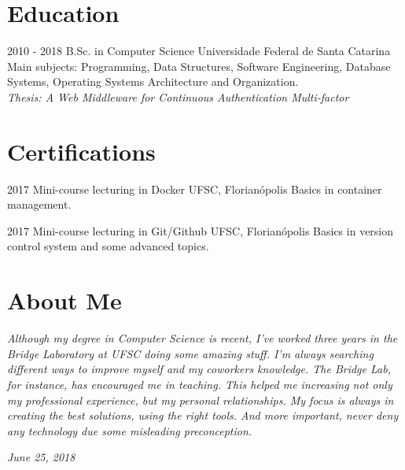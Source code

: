\documentclass{friggeri-cv}
\begin{document}
\section{Education}
\begin{entrylist}
  \entry
    {2010 - 2018}
    {B.Sc. in Computer Science}
    {Universidade Federal de Santa Catarina}
    {Main subjects: Programming, Data Structures, Software Engineering, Database Systems, Operating Systems Architecture and Organization.\\
    \emph{Thesis: A Web Middleware for Continuous Authentication Multi-factor }}\\
\end{entrylist}

\section{Certifications}
\begin{entrylist}
  \entry
    {2017}
    {Mini-course lecturing in Docker}
    {UFSC, Florianópolis}
    {Basics in container management.}
\end{entrylist}
\begin{entrylist}
  \entry
    {2017}
    {Mini-course lecturing in Git/Github}
    {UFSC, Florianópolis}
    {Basics in version control system and some advanced topics.}
\end{entrylist}

\section{About Me}
\emph{Although my degree in Computer Science is recent, I've worked three years in the Bridge Laboratory at UFSC doing some amazing stuff.
I'm always searching different ways to improve myself and my coworkers knowledge. The Bridge Lab, for instance, has encouraged me in teaching. This helped me increasing not only my professional experience, but my personal relationships.
My focus is always in creating the best solutions, using the right tools. And more important, never deny any technology due some misleading preconception.
}
\begin{flushright}
\emph{June 25, 2018}
\end{flushright}
\end{document}
